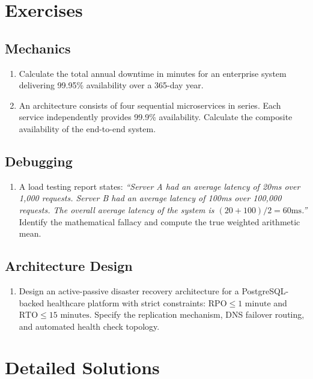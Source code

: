 \section{Exercises}

\subsection*{Mechanics}
\begin{enumerate}[leftmargin=18pt]
  \item Calculate the total annual downtime in minutes for an enterprise system delivering 99.95\% availability over a 365-day year.
  \item An architecture consists of four sequential microservices in series. Each service independently provides 99.9\% availability. Calculate the composite availability of the end-to-end system.
\end{enumerate}

\subsection*{Debugging}
\begin{enumerate}[leftmargin=18pt]
  \item A load testing report states: \textit{``Server A had an average latency of 20ms over 1,000 requests. Server B had an average latency of 100ms over 100,000 requests. The overall average latency of the system is $(20 + 100)/2 = 60\text{ms}$.''} Identify the mathematical fallacy and compute the true weighted arithmetic mean.
\end{enumerate}

\subsection*{Architecture Design}
\begin{enumerate}[leftmargin=18pt]
  \item Design an active-passive disaster recovery architecture for a PostgreSQL-backed healthcare platform with strict constraints: $\text{RPO} \le 1\text{ minute}$ and $\text{RTO} \le 15\text{ minutes}$. Specify the replication mechanism, DNS failover routing, and automated health check topology.
\end{enumerate}

\section{Detailed Solutions}

